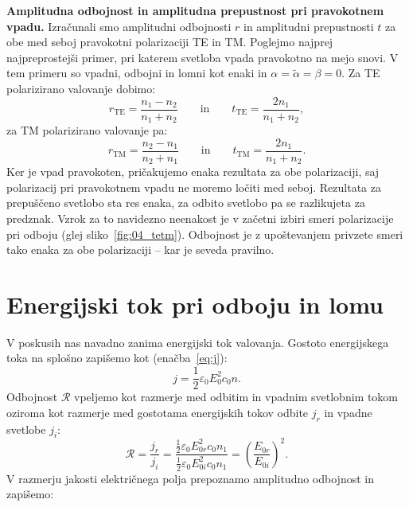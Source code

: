 \begin{example}{\bf Amplitudna odbojnost in amplitudna prepustnost pri pravokotnem vpadu.} 
Izračunali smo amplitudni odbojnosti $r$ in amplitudni prepustnosti $t$ za obe med seboj 
pravokotni polarizaciji TE in TM. Poglejmo najprej najpreprostejši primer, pri katerem
svetloba vpada pravokotno na mejo snovi. V tem primeru so vpadni, odbojni in 
lomni kot enaki in $\alpha = \tilde{\alpha} = \beta = 0$. Za TE polarizirano valovanje dobimo:
\begin{equation}
r_{\mathrm{TE}} = \frac{n_1 -n_2}{n_1+n_2} \qquad \mathrm{in} \qquad
t_{\mathrm{TE}} = \frac{2n_1}{n_1+n_2},
\label{eq:04_42}
\end{equation}
za TM polarizirano valovanje pa:
\begin{equation}
r_{\mathrm{TM}} = \frac{n_2 -n_1}{n_2+n_1} \qquad \mathrm{in} \qquad
t_{\mathrm{TM}} = \frac{2n_1}{n_1+n_2}.
\label{eq:04_43}
\end{equation}
Ker je vpad pravokoten, pričakujemo enaka rezultata za obe polarizaciji, saj 
polarizacij pri pravokotnem vpadu ne moremo ločiti med seboj. Rezultata za
prepuščeno svetlobo sta res enaka, za odbito svetlobo pa se razlikujeta za predznak.
Vzrok za to navidezno neenakost je v začetni izbiri smeri polarizacije 
pri odboju (glej sliko~\ref{fig:04_tetm}).
Odbojnost je z upoštevanjem privzete smeri tako enaka za obe polarizaciji 
-- kar je seveda pravilno.
\end{example}

\section{Energijski tok pri odboju in lomu}
V poskusih nas navadno zanima energijski tok valovanja. Gostoto energijskega
toka na splošno zapišemo kot (enačba~\ref{eq:j}):
\begin{equation}
j = \frac{1}{2} \varepsilon_0E_0^2 c_0 n.
\label{eq:04_44}
\end{equation}
Odbojnost $\mathcal{R}$ vpeljemo kot razmerje med odbitim in vpadnim svetlobnim tokom oziroma
kot razmerje med gostotama energijskih
tokov odbite $j_r$ in vpadne svetlobe $j_i$:
\begin{equation}
\mathcal{R} = \frac{j_r}{j_i} = \frac{\frac{1}{2}\varepsilon_0 E_{0r}^2 c_0 n_1}
{\frac{1}{2}\varepsilon_0 E_{0i}^2 c_0 n_1} = \left(\frac{E_{0r}}{E_{0i}}\right)^2\!\!.
\label{eq:04_45}
\end{equation}
V razmerju jakosti električnega polja prepoznamo amplitudno odbojnost in zapišemo:

